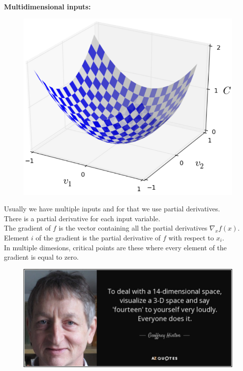 \documentclass[10pt, compress]{beamer}
\begin{document}
\begin{frame}
  \textbf{Multidimensional inputs:}
  \vspace{1cm}
  \begin{multicols}{2}
    \begin{figure}
      \includegraphics[width=1\linewidth]{imgs/gd_1}
    \end{figure}


    \columnbreak

  Usually we have multiple inputs and for that we use partial derivatives.\\
  There is a partial derivative for each input variable. \\
  The gradient of $f$ is the vector containing all the partial derivatives $\nabla_x f(x)$. Element $i$ of the gradient is the partial derivative of $f$ with respect to $x_i$. \\
  In multiple dimesions, critical points are these where every element of the gradient is equal to zero.
\end{multicols}
\end{frame}

\begin{frame}
    \begin{figure}
      \includegraphics[width=1\linewidth]{imgs/hinton_2}
    \end{figure}
\end{frame}
\end{document}

